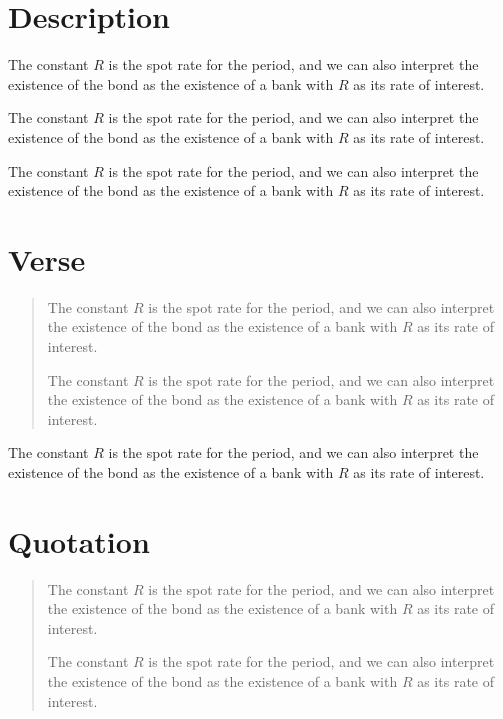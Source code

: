 \documentclass{Base}
\begin{document}
\section*{Description}

\begin{description}
\item The constant $R$ is the spot rate for the period, and we can also
interpret the existence of the bond as the existence of a bank
with $R$ as its rate of interest.


\item
The constant $R$ is the spot rate for the period, and we can also
interpret the existence of the bond as the existence of a bank
with $R$ as its rate of interest.
\end{description}

The constant $R$ is the spot rate for the period, and we can also
interpret the existence of the bond as the existence of a bank
with $R$ as its rate of interest.

\section*{Verse}

\begin{verse}
\item The constant $R$ is the spot rate for the period, and we can also
interpret the existence of the bond as the existence of a bank
with $R$ as its rate of interest.


\item
The constant $R$ is the spot rate for the period, and we can also
interpret the existence of the bond as the existence of a bank
with $R$ as its rate of interest.
\end{verse}


The constant $R$ is the spot rate for the period, and we can also
interpret the existence of the bond as the existence of a bank
with $R$ as its rate of interest.

\section*{Quotation}

\begin{quotation}
\item The constant $R$ is the spot rate for the period, and we can also
interpret the existence of the bond as the existence of a bank
with $R$ as its rate of interest.


\item
The constant $R$ is the spot rate for the period, and we can also
interpret the existence of the bond as the existence of a bank
with $R$ as its rate of interest.
\end{quotation}
\end{document}
